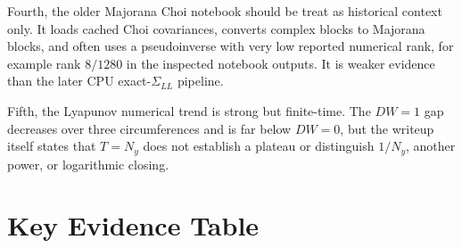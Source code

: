 \documentclass[aps,prb,onecolumn,nofootinbib,superscriptaddress]{revtex4-2}
\newcommand{\SigmaLL}{\Sigma_{LL}}
\begin{document}
Fourth, the older  Majorana Choi notebook should be
treat as historical context only.  It loads cached Choi covariances, converts
complex blocks to Majorana blocks, and often uses a pseudoinverse with very low
reported numerical rank, for example rank \(8/1280\) in the inspected notebook
outputs.  It is weaker evidence than the later CPU exact-\(\SigmaLL\) pipeline.

Fifth, the Lyapunov numerical trend is strong but finite-time.  The \(DW=1\)
gap decreases over three circumferences and is far below \(DW=0\), but the
writeup itself states that \(T=N_y\) does not establish a plateau or distinguish
\(1/N_y\), another power, or logarithmic closing.

\section{Key Evidence Table}
\end{document}
